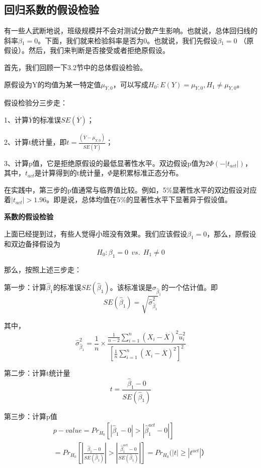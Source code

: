 \documentclass[cn,12pt,math=newtx,citestyle=gb7714-2015,bibstyle=gb7714-2015]{elegantbook}
\begin{document}
	\subsection{回归系数的假设检验}
	有一些人武断地说，班级规模并不会对测试分数产生影响。也就说，总体回归线的斜率$\beta{_1}=0$。下面，我们就来检验斜率是否为0。也就说，我们先假设$\beta{_1}=0$ （原假设）。然后，我们来判断是否接受或者拒绝原假设。
	
	首先，我们回顾一下3.2节中的总体假设检验。
	
	原假设为Y的均值为某一特定值$\mu_{Y,0}$，可以写成$H_0:E(Y)=\mu_{Y,0},H_1\neq\mu_{Y,0}$。
	
	假设检验分三步走：
	
	1、计算$\overline{Y}$的标准误$SE(\overline{Y})$；
	
	2、计算t统计量，即$t=\frac{(\overline{Y}-\mu_{Y,0})}{SE(\overline{Y})}$；
	
	3、计算p值，它是拒绝原假设的最低显著性水平。双边假设p值为$2\Phi{(-|t_{act}|)}$，其中，$t_{act}$是计算得到的t统计量，$\Phi$是积累标准正态分布。
	
	在实践中，第三步的p值通常与临界值比较。例如，5\%显著性水平的双边假设对应着$|t_{act}|>1.96$。即是说，总体均值在5\%的显著性水平下显著异于假设值。
	
	\textbf{系数的假设检验}
	
	上面已经提到过，有些人觉得小班没有效果。我们应该假设$\beta_1=0$，那么，原假设和双边备择假设为
	\begin{equation}
		H_0:\beta_1=0~~vs.~~H_1\neq0
	\end{equation}
	
	那么，按照上述三步走：
	
	第一步：计算$\hat{\beta}_1$的标准误$SE(\hat{\beta}_1)$。该标准误是$\sigma_{\hat{\beta}_1}$的一个估计值。即
	\begin{equation}
		SE(\hat{\beta}_1)=\sqrt{\hat{\sigma}_{\hat{\beta}_1}^2}
	\end{equation}
	
	其中，
	\begin{equation}
		\hat{\sigma}_{\hat{\beta}_1}^2=\frac{1}{n}\times\frac{\frac{1}{n-2}\sum_{i=1}^n{(X_i-\overline{X})^2\hat{u}_i^2}}{[\frac{1}{n}\sum_{i=1}^n{(X_i-\overline{X})^2}]^2}
	\end{equation}
	
	第二步：计算t统计量
	\begin{equation}
		t=\frac{\hat{\beta}_1-0}{SE(\hat{\beta}_1)}
	\end{equation}
	
	第三步：计算p值
	\begin{multline}
		p-value=Pr_{H_0}[|\hat{\beta}_1-0|>|\hat{\beta}_1^{act}-0|]\\
		=Pr_{H_0}[|\frac{\hat{\beta}_1-0}{SE(\hat{\beta}_1)}|>|\frac{\hat{\beta}_1^{act}-0}{SE(\hat{\beta}_1)}|]=Pr_{H_0}(|t|\geq|t^{act}|）
	\end{multline}
	
\end{document}
